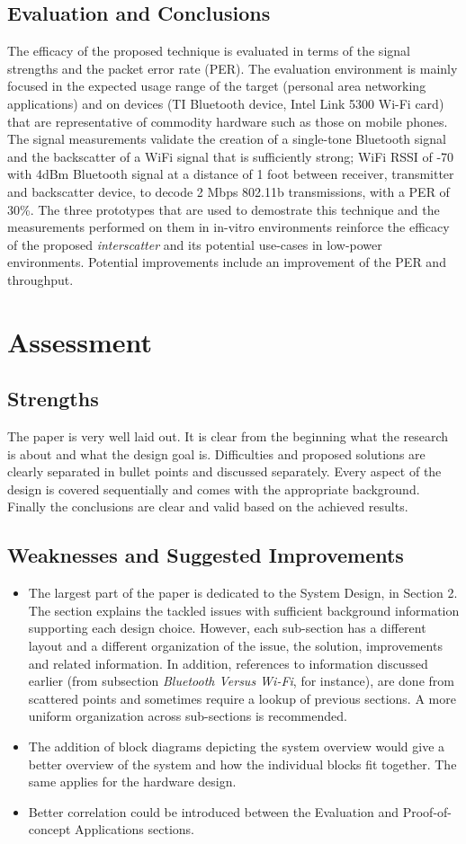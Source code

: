 \documentclass[a4paper]{article}
\begin{document}
\subsection{Evaluation and Conclusions}
The efficacy of the proposed technique is evaluated in terms of the signal strengths and the packet error rate (PER). The evaluation environment is mainly focused in the expected usage range of the target (personal area networking applications) and on devices (TI Bluetooth device, Intel Link 5300 Wi-Fi card) that are representative of commodity hardware such as those on mobile phones. The signal measurements validate the creation of a single-tone Bluetooth signal and the backscatter of a WiFi signal that is sufficiently strong; WiFi RSSI of -70 with 4dBm Bluetooth signal at a distance of 1 foot between receiver, transmitter and backscatter device, to decode 2 Mbps 802.11b transmissions, with a PER of 30\%. 
The three prototypes that are used to demostrate this technique and the measurements performed on them in in-vitro environments reinforce the efficacy of the proposed \textit{interscatter} and its potential use-cases in low-power environments. Potential improvements include an improvement of the PER and throughput.

\section{Assessment}
\subsection{Strengths}
The paper is very well laid out. It is clear from the beginning what the research is about and what the design goal is. Difficulties and proposed solutions are clearly separated in bullet points and discussed separately. Every aspect of the design is covered sequentially and comes with the appropriate background. Finally the conclusions are clear and valid based on the achieved results.
\subsection{Weaknesses and Suggested Improvements}
\begin{itemize}
\item The largest part of the paper is dedicated to the System Design, in Section 2. The section explains the tackled issues with sufficient background information supporting each design choice. However, each sub-section has a different layout and a different organization of the issue, the solution, improvements and related information. In addition, references to information discussed earlier (from subsection \textit{Bluetooth Versus Wi-Fi}, for instance), are done from scattered points and sometimes require a lookup of previous sections. A more uniform organization across sub-sections is recommended.
\item The addition of block diagrams depicting the system overview would give a better overview of the system and how the individual blocks fit together. The same applies for the hardware design.
\item Better correlation could be introduced between the Evaluation and Proof-of-concept Applications sections.
\end{itemize}
\end{document}
